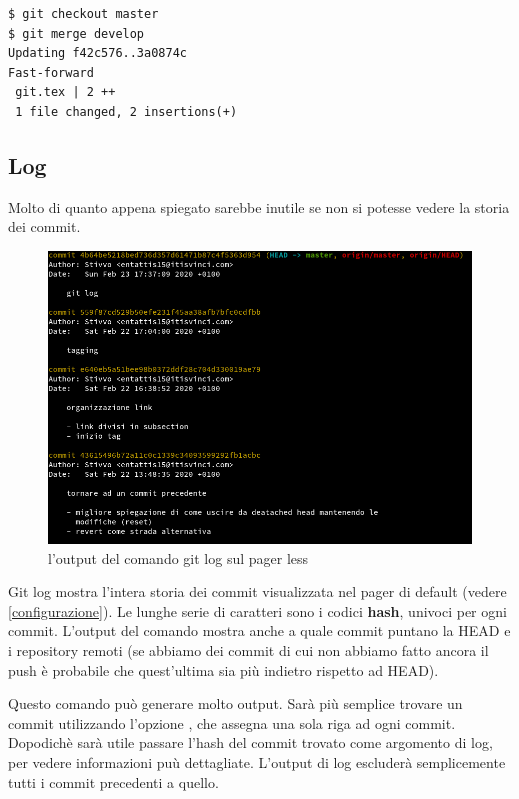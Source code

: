 \documentclass{article} \usepackage[textwidth=19cm,textheight=24cm]{geometry}
\begin{document}
\begin{verbatim}
$ git checkout master
$ git merge develop
Updating f42c576..3a0874c
Fast-forward
 git.tex | 2 ++
 1 file changed, 2 insertions(+)
\end{verbatim}

\subsection{Log\label{log}}

Molto di quanto appena spiegato sarebbe inutile se non si potesse vedere la
storia dei commit.

\begin{figure}
\includegraphics[width=6in]{img/logOutput.png}
\centering
\caption{l'output del comando git log sul pager less}
\end{figure}

Git log mostra l'intera storia dei commit visualizzata nel pager di default
(vedere \ref{configurazione}).
Le lunghe serie di caratteri sono i codici \textbf{hash}, univoci per ogni
commit. L'output del comando mostra anche a quale commit puntano la HEAD e i
repository remoti (se abbiamo dei commit di cui non abbiamo fatto ancora il push
è probabile che quest'ultima sia più indietro rispetto ad HEAD).

Questo comando può generare molto output. Sarà più semplice trovare un commit
utilizzando l'opzione , che assegna una sola
riga ad ogni commit. Dopodichè sarà utile passare l'hash del commit trovato come
argomento di log, per vedere informazioni puù dettagliate. L'output di log
escluderà semplicemente tutti i commit precedenti a quello.
\end{document}
